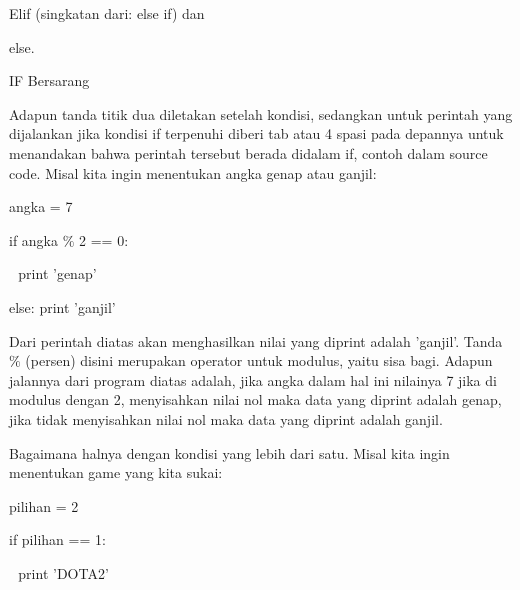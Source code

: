 Elif (singkatan dari: else if) dan \par
\noindent 
\vspace{\baselineskip}
else.\vspace{\baselineskip}
 \par
\noindent 
\vspace{\baselineskip}
IF Bersarang \par
\noindent 
\vspace{\baselineskip}
Adapun tanda titik dua diletakan setelah kondisi, sedangkan untuk perintah yang dijalankan jika kondisi if terpenuhi diberi tab atau 4 spasi pada depannya untuk menandakan bahwa perintah tersebut berada didalam if, contoh dalam source code. Misal kita ingin menentukan angka genap atau ganjil: \par
\noindent 
\vspace{\baselineskip}
angka = 7 \par
\noindent 
\vspace{\baselineskip}
if angka  $  \%  $ 2 == 0: \par
\noindent 
\vspace{\baselineskip}
 $  $  $  $ print 'genap' \par
\noindent 
\vspace{\baselineskip}
else:\vspace{\baselineskip}
 $  $print 'ganjil' \par
\noindent 
\vspace{\baselineskip}
 Dari perintah diatas akan menghasilkan nilai yang diprint adalah 'ganjil'. Tanda  $  \%  $ (persen) disini merupakan operator untuk modulus, yaitu sisa bagi. Adapun jalannya dari program diatas adalah, jika angka dalam hal ini nilainya 7 jika di modulus dengan 2, menyisahkan nilai nol maka data yang diprint adalah genap, jika tidak menyisahkan nilai nol maka data yang diprint adalah ganjil. \par
\noindent 
\vspace{\baselineskip}
Bagaimana halnya dengan kondisi yang lebih dari satu. Misal kita ingin menentukan game yang kita sukai: \par
\noindent 
\vspace{\baselineskip}
pilihan = 2 \par
\noindent 
\vspace{\baselineskip}
if pilihan == 1: \par
\noindent 
\vspace{\baselineskip}
 $  $  $  $ print 'DOTA2' \par
\noindent 
